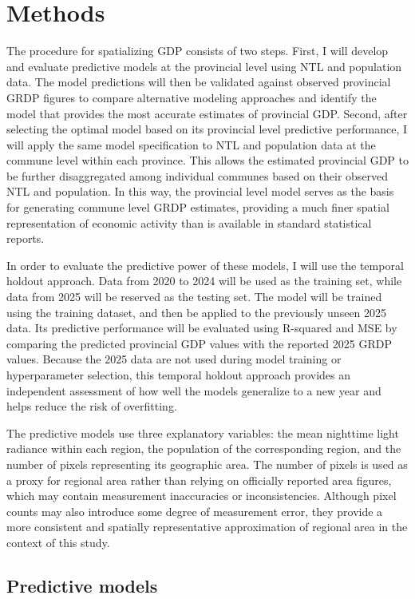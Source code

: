 \documentclass[11pt]{article} %
\begin{document}
\section{Methods}

The procedure for spatializing GDP consists of two steps. First, I will develop and evaluate predictive models at the provincial level using NTL and population data. The model predictions will then be validated against observed provincial GRDP figures to compare alternative modeling approaches and identify the model that provides the most accurate estimates of provincial GDP. Second, after selecting the optimal model based on its provincial level predictive performance, I will apply the same model specification to NTL and population data at the commune level within each province. This allows the estimated provincial GDP to be further disaggregated among individual communes based on their observed NTL and population. In this way, the provincial level model serves as the basis for generating commune level GRDP estimates, providing a much finer spatial representation of economic activity than is available in standard statistical reports.

In order to evaluate the predictive power of these models, I will use the temporal holdout approach. Data from 2020 to 2024 will be used as the training set, while data from 2025 will be reserved as the testing set. The model will be trained using the training dataset, and then be applied to the previously unseen 2025 data. Its predictive performance will be evaluated using R-squared and MSE by comparing the predicted provincial GDP values with the reported 2025 GRDP values. Because the 2025 data are not used during model training or hyperparameter selection, this temporal holdout approach provides an independent assessment of how well the models generalize to a new year and helps reduce the risk of overfitting.

The predictive models use three explanatory variables: the mean nighttime light radiance within each region, the population of the corresponding region, and the number of pixels representing its geographic area. The number of pixels is used as a proxy for regional area rather than relying on officially reported area figures, which may contain measurement inaccuracies or inconsistencies. Although pixel counts may also introduce some degree of measurement error, they provide a more consistent and spatially representative approximation of regional area in the context of this study.

\subsection{Predictive models}
\end{document}
